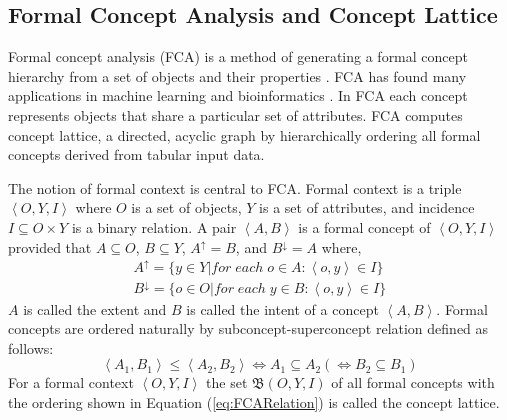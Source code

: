 \subsection{Formal Concept Analysis and Concept Lattice}\label{sec:FCA}
Formal concept analysis (FCA) is a method of generating a formal concept hierarchy from a set of objects and their properties \cite{Wille10.1007/978-94-009-7798-3_15}. FCA has found many applications in machine learning and bioinformatics \cite{Motameny10.1007/978-3-540-78137-0_17,EngelbertF10.1007/BFb0026700,nguifo1993prediction}. In FCA each concept represents objects that share a particular set of attributes. FCA computes concept lattice, a directed, acyclic graph by hierarchically ordering all formal concepts derived from tabular input data.

The notion of formal context is central to FCA. Formal context is a triple \(\left\langle O,Y, I\right\rangle\) where \( O\) is a set of objects, \( Y\) is a set of attributes, and incidence \( I\subseteq O\times Y\) is a binary relation. A pair \(\left\langle A,B\right\rangle\)  is a formal concept of \(\left\langle O,Y, I\right\rangle\) provided that \( A\subseteq O\), \( B\subseteq Y\), \( A^{\uparrow } = B\), and \( B^{\downarrow } = A\) where,
\begin{gather}
	A^{\uparrow } = \{ y\in Y\vert for\;each\;o\in A:\left\langle o,y\right\rangle \in I\}\ \\
	B^{\downarrow } = \{ o\in O\vert for\; each\; y\in B:\left\langle o,y\right\rangle \in I\}
\end{gather}
$A$ is called the extent and $B$ is called the intent of a concept \(\left\langle A,B\right\rangle\). Formal concepts are ordered naturally by subconcept-superconcept relation defined as follows:
\begin{equation}\label{eq:FCARelation}
	\left\langle A_{1},B_{1}\right\rangle \leq\left\langle A_{2},B_{2}\right\rangle  \Longleftrightarrow  A_{1}\subseteq A_{2}(\Longleftrightarrow B_{2}\subseteq B_{1})
\end{equation}
For a formal context \(\left\langle O,Y, I\right\rangle\) the set \(\mathfrak{B}(O,Y,I)\) of all formal concepts with the ordering shown in Equation (\ref{eq:FCARelation}) is called the concept lattice.

